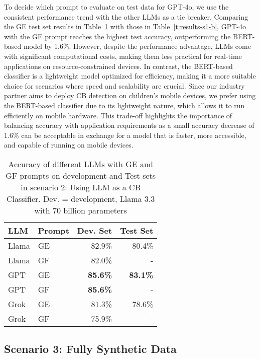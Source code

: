 To decide which prompt to evaluate on test data for GPT-4o, we use the consistent performance trend with the other LLMs as a tie breaker.
Comparing the GE test set results in Table~\ref{t:results-s2} with those in
Table~\ref{t:results-s1-b}, GPT-4o with the GE prompt reaches the highest test accuracy, outperforming the BERT-based model by 1.6\%.
However, despite the performance advantage, LLMs come with significant computational costs, making them less practical for real-time applications on resource-constrained devices.
In contrast, the BERT-based classifier is a lightweight model optimized for efficiency, making it a more suitable choice for scenarios where speed and scalability are crucial. Since our industry partner aims to deploy CB detection on children's mobile devices, we prefer using the BERT-based classifier due to its lightweight nature, which allows it to run efficiently on mobile hardware.
This trade-off highlights the importance of balancing accuracy with %
application requirements
as a small accuracy decrease of 1.6\% can be acceptable in exchange for a model that is faster, more accessible, and capable of running on mobile devices.

\begin{table}[ht]
\centering
\begin{tabular}{llrr}
\textbf{LLM} & \textbf{Prompt} & \textbf{Dev. Set} & \textbf{Test Set} \\
\hline
Llama & GE & 82.9\% & 80.4\% \\
Llama & GF & 82.0\% & -\\
\hline
GPT & GE & \textbf{85.6\%} & \textbf{83.1\%} \\
GPT & GF & \textbf{85.6\%} & - \\
\hline
Grok & GE & 81.3\% & 78.6\% \\
Grok & GF & 75.9\% & - \\
\hline
\end{tabular}
\caption{Accuracy of different LLMs with GE and GF prompts on development and Test sets in scenario 2: Using LLM as a CB Classifier. Dev. = development, Llama 3.3 with 70 billion parameters}
\label{t:results-s2}
\end{table}



\subsection{Scenario 3: Fully Synthetic Data}  

